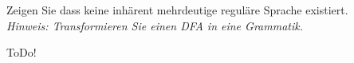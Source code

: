 
\begin{exercise}

Zeigen Sie dass keine inhärent mehrdeutige reguläre Sprache existiert. \\

\textit{Hinweis: Transformieren Sie einen DFA in eine Grammatik.}

\end{exercise}


\begin{solution}

ToDo!

\end{solution}

